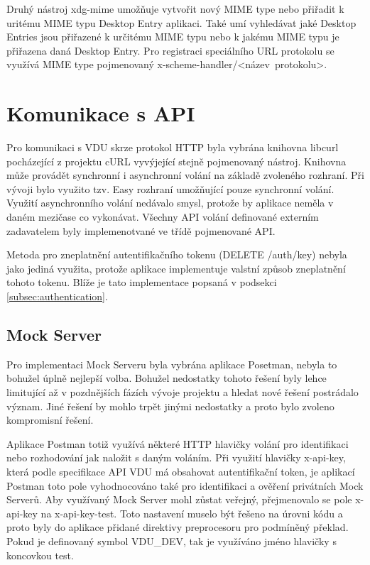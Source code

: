Druhý nástroj xdg-mime umožňuje vytvořit nový MIME type nebo přiřadit k uritému MIME typu Desktop Entry aplikaci. Také umí vyhledávat jaké Desktop Entries jsou přiřazené
k určitému MIME typu nebo k jakému MIME typu je přiřazena daná Desktop Entry. Pro registraci speciálního URL protokolu se využívá MIME type pojmenovaný 
\mbox{x-scheme-handler/<název protokolu>}.

\section{Komunikace s API}

Pro komunikaci s VDU skrze protokol HTTP byla vybrána knihovna libcurl pocházející z projektu cURL vyvýjející stejně pojmenovaný nástroj. Knihovna může provádět
synchronní i asynchronní volání na základě zvoleného rozhraní. Při vývoji bylo využito tzv. Easy rozhraní umožňující pouze synchronní volání. Využití asynchronního volání
nedávalo smysl, protože by aplikace neměla v daném mezičase co vykonávat. Všechny API volání definované externím zadavatelem byly implemenotvané ve třídě pojmenované API.

Metoda pro zneplatnění autentifikačního tokenu (DELETE /auth/key) nebyla jako jediná využita, protože aplikace implementuje valstní způsob zneplatnění tohoto tokenu. Blíže 
je tato implementace popsaná v podsekci \ref{subsec:authentication}.

\subsection{Mock Server}

Pro implementaci Mock Serveru byla vybrána aplikace Posetman, nebyla to bohužel úplně nejlepší volba. Bohužel nedostatky tohoto řešení byly lehce limitující až v pozdnějších
fázích vývoje projektu a hledat nové řešení postrádalo význam. Jiné řešení by mohlo trpět jinými nedostatky a proto bylo zvoleno kompromisní řešení.

Aplikace Postman totiž využívá některé HTTP hlavičky volání pro identifikaci nebo rozhodování jak naložit s daným voláním. Při využití hlavičky x-api-key, která podle
specifikace API VDU má obsahovat autentifikační token, je aplikací Postman toto pole vyhodnocováno také pro identifikaci a ověření privátních Mock Serverů. Aby využívaný
Mock Server mohl zůstat veřejný, přejmenovalo se pole x-api-key na x-api-key-test. Toto nastavení muselo být řešeno na úrovni kódu a proto byly do aplikace přidané
direktivy preprocesoru pro podmíněný překlad. Pokud je definovaný symbol VDU\_DEV, tak je využíváno jméno hlavičky s koncovkou test.

